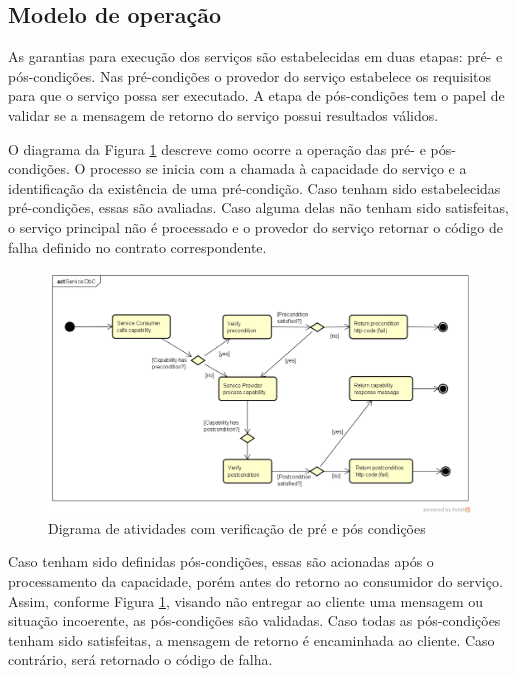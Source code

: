 \vspace{-6mm}

\subsection{Modelo de operação}
\vspace{-6mm}

As garantias para execução dos serviços são estabelecidas em duas etapas: pré- e
pós-condições. Nas pré-condições o provedor do serviço estabelece os requisitos
para que o serviço possa ser executado. A etapa de pós-condições tem o papel de
validar se a mensagem de retorno do serviço possui resultados válidos.

O diagrama da Figura \ref{FigServiceDbC} descreve como ocorre a operação das
pré- e pós-condições. O processo se inicia com a chamada à capacidade do serviço e a
identificação da existência de uma pré-condição. Caso tenham sido estabelecidas 
pré-condições, essas são avaliadas. Caso alguma delas não tenham sido
satisfeitas, o serviço principal não é processado e o provedor do serviço
retornar o código de falha definido no contrato correspondente.


\begin{figure}[!htb]
\centering
\includegraphics[width=\textwidth,trim = 0mm 5mm 0mm 0mm,clip]{ServiceDbC.png}
\caption{Digrama de atividades com verificação de pré e pós condições}
\label{FigServiceDbC}
\end{figure}

Caso tenham sido definidas pós-condições, essas são acionadas após o
processamento da capacidade, porém antes do retorno ao consumidor do serviço.
Assim, conforme Figura \ref{FigServiceDbC}, visando não entregar ao cliente uma
mensagem ou situação incoerente, as pós-condições são validadas. Caso todas as
pós-condições tenham sido satisfeitas, a mensagem de retorno é encaminhada ao
cliente. Caso contrário, será retornado o código de falha.


